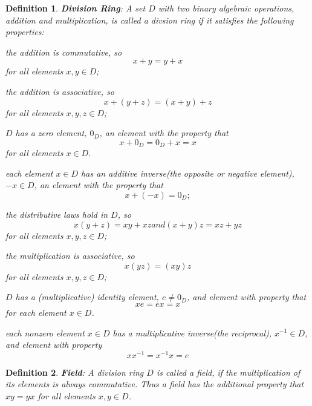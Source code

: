 \documentclass[a4paper]{article}
\newtheorem{definition}{Definition}[section]
\begin{document}
\begin{definition}
	\textbf{Division Ring}: A set $D$ with two binary algebraic
	operations, addition and multiplication, is called a divsion ring if
	it satisfies the following properties:
	\begin{compactitem}
	\item
		the addition is commutative, so 
		\begin{displaymath}
			x + y = y + x
		\end{displaymath}
		for all elements $x,y \in D$;
	\item
		the addition is associative, so
		\begin{displaymath}
			x + (y + z) = (x + y) + z
		\end{displaymath}
		for all elements $x,y,z \in D$;
	\item
		$D$ has a zero element, $0_D$, an element with the property that 
		\begin{displaymath}
			x + 0_D = 0_D + x = x
		\end{displaymath}
		for all elements $x \in D$.
	\item
		each element $x \in D$ has an additive inverse(the opposite or
		negative element), $-x \in D$, an element with the property that
		\begin{displaymath}
			x + (-x) = 0_D;
		\end{displaymath}
	\item
		the distributive laws hold in $D$, so
		\begin{displaymath}
			x(y + z) = xy + xz and (x + y)z = xz + yz
		\end{displaymath}
		for all elements $x,y,z \in D$;
	\item
		the multiplication is associative, so
		\begin{displaymath}
			x(yz) = (xy)z
		\end{displaymath}
		for all elements $x,y,z \in D$;
	\item
		$D$ has a (multiplicative) identity element, $e \neq 0_D$, and
		element with property that
		\begin{displaymath}
			xe = ex = x
		\end{displaymath}
		for each element $x \in D$.
	\item
		each nonzero element $x \in D$ has a multiplicative inverse(the
		reciprocal), $x^{-1} \in D$, and element with property
		\begin{displaymath}
			xx^{-1} = x^{-1}x = e
		\end{displaymath}
	\end{compactitem}\cite{dixon2011algebra}
\end{definition}

\begin{definition}
	\textbf{Field}: A division ring $D$ is called a field, if the
	multiplication of its elements is always commutative. Thus a field has
	the additional property that $xy = yx$ for all elements $x,y \in D$.
\end{definition}



\end{document}
